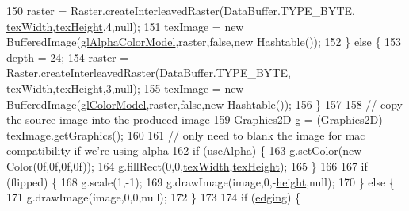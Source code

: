 \begin{DoxyCode}
150             raster = Raster.createInterleavedRaster(DataBuffer.TYPE\_BYTE,
      \mbox{\hyperlink{classorg_1_1newdawn_1_1slick_1_1opengl_1_1_image_i_o_image_data_a2b79f8a3215961aed7f7be8196e14c75}{texWidth}},\mbox{\hyperlink{classorg_1_1newdawn_1_1slick_1_1opengl_1_1_image_i_o_image_data_a597e80bbf4e36c072de2b875ba4283c2}{texHeight}},4,null);
151             texImage = \textcolor{keyword}{new} BufferedImage(\mbox{\hyperlink{classorg_1_1newdawn_1_1slick_1_1opengl_1_1_image_i_o_image_data_a80bd17b614a20a6e5219c1c0405cb831}{glAlphaColorModel}},raster,\textcolor{keyword}{false},\textcolor{keyword}{new} Hashtable());
152         \} \textcolor{keywordflow}{else} \{
153             \mbox{\hyperlink{classorg_1_1newdawn_1_1slick_1_1opengl_1_1_image_i_o_image_data_a9732e4c418ef7044cb5ee44f1a6e5f69}{depth}} = 24;
154             raster = Raster.createInterleavedRaster(DataBuffer.TYPE\_BYTE,
      \mbox{\hyperlink{classorg_1_1newdawn_1_1slick_1_1opengl_1_1_image_i_o_image_data_a2b79f8a3215961aed7f7be8196e14c75}{texWidth}},\mbox{\hyperlink{classorg_1_1newdawn_1_1slick_1_1opengl_1_1_image_i_o_image_data_a597e80bbf4e36c072de2b875ba4283c2}{texHeight}},3,null);
155             texImage = \textcolor{keyword}{new} BufferedImage(\mbox{\hyperlink{classorg_1_1newdawn_1_1slick_1_1opengl_1_1_image_i_o_image_data_a9601f68113edb6dd92818c5fa548d1f5}{glColorModel}},raster,\textcolor{keyword}{false},\textcolor{keyword}{new} Hashtable());
156         \}
157             
158         \textcolor{comment}{// copy the source image into the produced image}
159         Graphics2D g = (Graphics2D) texImage.getGraphics();
160         
161         \textcolor{comment}{// only need to blank the image for mac compatibility if we're using alpha}
162         \textcolor{keywordflow}{if} (useAlpha) \{
163             g.setColor(\textcolor{keyword}{new} Color(0f,0f,0f,0f));
164             g.fillRect(0,0,\mbox{\hyperlink{classorg_1_1newdawn_1_1slick_1_1opengl_1_1_image_i_o_image_data_a2b79f8a3215961aed7f7be8196e14c75}{texWidth}},\mbox{\hyperlink{classorg_1_1newdawn_1_1slick_1_1opengl_1_1_image_i_o_image_data_a597e80bbf4e36c072de2b875ba4283c2}{texHeight}});
165         \}
166         
167         \textcolor{keywordflow}{if} (flipped) \{
168             g.scale(1,-1);
169             g.drawImage(image,0,-\mbox{\hyperlink{classorg_1_1newdawn_1_1slick_1_1opengl_1_1_image_i_o_image_data_af79cc456f73fe9b84d5803f4fb41348b}{height}},null);
170         \} \textcolor{keywordflow}{else} \{
171             g.drawImage(image,0,0,null);
172         \}
173         
174         \textcolor{keywordflow}{if} (\mbox{\hyperlink{classorg_1_1newdawn_1_1slick_1_1opengl_1_1_image_i_o_image_data_ae93f5c7af2aa1995c55cd584bf5e9735}{edging}}) \{

\end{DoxyCode}
